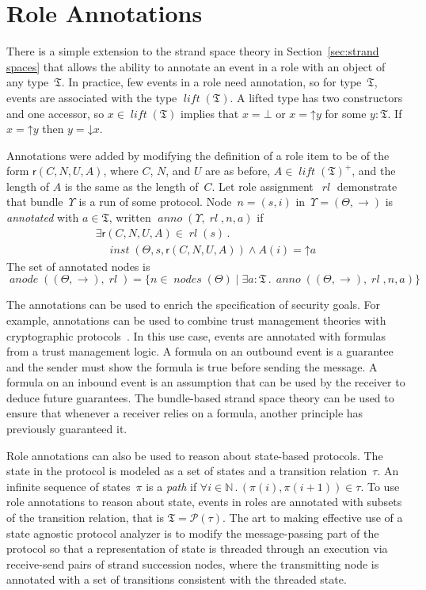 \documentclass[titlepage,12pt]{article}
\newcommand{\fn}[1]{\ensuremath{\operatorname{\mathit{#1}}}}
\newcommand{\typ}{\mathbin:}
\newcommand{\nat}{\ensuremath{\mathbb{N}}}
\newcommand{\all}[1]{\forall#1\mathpunct.}
\newcommand{\some}[1]{\exists#1\mathpunct.}
\newcommand{\pow}[1]{\mathcal P(#1)}
\newcommand{\rl}{\fn{rl}}
\newcommand{\role}{\mathsf{r}}
\newcommand{\tran}{\ensuremath{\tau}}
\newcommand{\pth}{\ensuremath{\pi}}
\newcommand{\type}{\ensuremath{\mathfrak T}}
\newcommand{\up}{\mathord\uparrow}
\newcommand{\down}{\mathord\downarrow}
\begin{document}
\appendix

\section{Role Annotations}\label{sec:role annotations}

There is a simple extension to the strand space theory in
Section~\ref{sec:strand spaces} that allows the ability to annotate an
event in a role with an object of any type~$\type$.  In practice, few
events in a role need annotation, so for type~\type, events are
associated with the type $\fn{lift}(\type)$.  A lifted type has two constructors and one accessor, so
$x\in\fn{lift}(\type)$ implies that $x=\bot$ or $x=\up y$ for some
$y\typ\type$.  If $x=\up y$ then $y=\down x$.

Annotations were added by modifying the definition of a role item to
be of the form $\role(C,N,U,A)$, where $C$, $N$, and $U$ are as
before, $A\in\fn{lift}(\type)^+$, and the length of $A$ is the same as
the length of~$C$.  Let role assignment~$\rl$ demonstrate that
bundle~$\Upsilon$ is a run of some protocol.  Node~$n=(s,i)$
in~$\Upsilon=(\Theta,\to)$ is \emph{annotated} with
$a\in\type$, written $\fn{anno}(\Upsilon,\rl,n,a)$ if
$$\begin{array}{l}
\some{\role(C,N,U,A)\in\rl(s)}\\
\quad\fn{inst}(\Theta,s,\role(C,N,U,A))\wedge A(i)=\up a
\end{array}$$
The set of annotated nodes is
$$\fn{anode}((\Theta,\to),\rl)=\{n\in\fn{nodes}(\Theta)\mid
\some{a\typ\type}\fn{anno}((\Theta,\to),\rl,n,a)\}$$

The annotations can be used to enrich the specification of security
goals.  For example, annotations can be used to combine trust management theories with cryptographic
protocols~\cite{GuttmanEtAl04}.  In this use case, events are
annotated with formulas from a trust management logic.  A formula on
an outbound event is a guarantee and the sender must show the formula
is true before sending the message.  A formula on an inbound event is
an assumption that can be used by the receiver to deduce future
guarantees.  The bundle-based strand space theory can be used to
ensure that whenever a receiver relies on a formula, another principle
has previously guaranteed it.

Role annotations can also be used to reason about state-based
protocols.  The state in the protocol is modeled as a set of states
and a transition relation~$\tran$.  An
infinite sequence of states~$\pth$ is a \emph{path} if
$\all{i\in\nat}(\pth(i),\pth(i+1))\in\tran$.  To use role annotations
to reason about state, events in roles are annotated with subsets of
the transition relation, that is $\type=\pow{\tau}$.  The art to
making effective use of a state agnostic protocol analyzer is to
modify the message-passing part of the protocol so that a
representation of state is threaded through an execution via
receive-send pairs of strand succession nodes, where the transmitting
node is annotated with a set of transitions consistent with the
threaded state.
\end{document}
